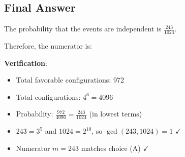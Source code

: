 \documentclass[12pt]{article}
\begin{document}
\subsection*{Final Answer}

The probability that the events are independent is $\frac{243}{1024}$.

Therefore, the numerator is:

\begin{center}
\end{center}

\textbf{Verification}:
\begin{itemize}
    \item Total favorable configurations: 972
    \item Total configurations: $4^6 = 4096$
    \item Probability: $\frac{972}{4096} = \frac{243}{1024}$ (in lowest terms)
    \item $243 = 3^5$ and $1024 = 2^{10}$, so $\gcd(243, 1024) = 1$ $\checkmark$
    \item Numerator $m = 243$ matches choice (A) $\checkmark$
\end{itemize}
\end{document}
